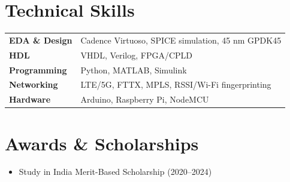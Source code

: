 \documentclass[10.5pt,letterpaper]{article}
\begin{document}
\section*{Technical Skills}
{\renewcommand{\arraystretch}{1.25}
\begin{tabular}{@{}p{}p{}@{}}
  \textbf{EDA \& Design} & Cadence Virtuoso, SPICE simulation, 45 nm GPDK45 \\
  \textbf{HDL}           & VHDL, Verilog, FPGA/CPLD \\
  \textbf{Programming}   & Python, MATLAB, Simulink \\
  \textbf{Networking}    & LTE/5G, FTTX, MPLS, RSSI/Wi-Fi fingerprinting \\
  \textbf{Hardware}      & Arduino, Raspberry Pi, NodeMCU \\
\end{tabular}}

\section*{Awards \& Scholarships}
\begin{itemize}
  \item Study in India Merit-Based Scholarship (2020--2024)
\end{itemize}
\end{document}
